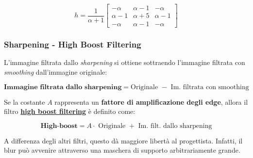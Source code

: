 \documentclass[a4paper]{article}
\begin{document}
	\begin{equation*}
		h = \dfrac{1}{\alpha + 1} \begin{bmatrix}
			-\alpha  & \alpha-1 & -\alpha  \\
			\alpha-1 & \alpha+5 & \alpha-1 \\
			-\alpha	 & \alpha-1 & -\alpha
		\end{bmatrix}
	\end{equation*}
	
	\subsubsection{Sharpening - High Boost Filtering}
	
	L'immagine filtrata dallo \emph{sharpening} si ottiene sottraendo l'immagine filtrata con \emph{smoothing} dall'immagine originale:
	
	\begin{equation*}
		\textbf{Immagine filtrata dallo sharpening} = \text{Originale } - \text{ Im. filtrata con smoothing}
	\end{equation*}

	\noindent
	Se la costante $A$ rappresenta un \textbf{fattore di amplificazione degli edge}, allora il filtro \textcolor{Red3}{\textbf{\underline{high boost filtering}}} è definito come:
	
	\begin{equation*}
		\textbf{High-boost} = A \cdot \text{ Originale } + \text{ Im. filt. dallo sharpening}
	\end{equation*}

	\noindent
	A differenza degli altri filtri, questo dà maggiore libertà al progettista. Infatti, il blur può avvenire attraverso una maschera di supporto arbitrariamente grande.
\end{document}

